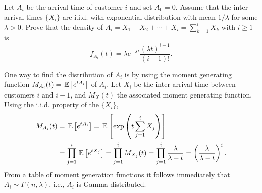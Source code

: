   \begin{question}
 Let $A_i$ be the arrival time of customer $i$ and set $A_0=0$.
    Assume that the inter-arrival times $\{X_i\}$ are i.i.d.  with
    exponential distribution with mean $1/\lambda$ for some
    $\lambda>0$.  Prove that the density of
    $A_i=X_1+X_2+\cdots+X_i=\sum_{k=1}^i X_k$ with $i\geq 1$ is
\begin{equation*}
f_{A_i}(t) = \lambda e^{-\lambda t} \frac{(\lambda t)^{i-1}}{(i-1)!}. 
\end{equation*}
\begin{solution}
 One way to find the distribution of $A_i$ is by using the
    moment generating function $M_{A_i}(t) = \,\mathbb{E}\left[e^{t A_i}\right]$ of
    $A_i$. Let $X_i$ be the inter-arrival time between customers $i$
    and $i-1$, and $M_X(t)$ the associated moment generating
    function. Using the i.i.d. property of the $\{X_i\}$,
\begin{equation*}
  \begin{split}
  M_{A_i}(t) &= \,\mathbb{E}\left[e^{t A_i}\right] = \,\mathbb{E}\left[\exp\left(t\sum_{j=1}^{i} X_j\right)\right] \\
& = \prod_{j=1}^{i} \,\mathbb{E}\left[e^{tX_j}\right] = 
\prod_{j=1}^{i} M_{X_j}(t) = 
\prod_{j=1}^{i} \frac{\lambda}{\lambda -t }
 = \left(\frac{\lambda}{\lambda -t }\right)^i.
  \end{split}
\end{equation*}
From a table of moment generation functions it follows immediately that
$A_i \sim \Gamma(n,\lambda)$, i.e., $A_i$ is Gamma distributed.
\end{solution}

\end{question}

